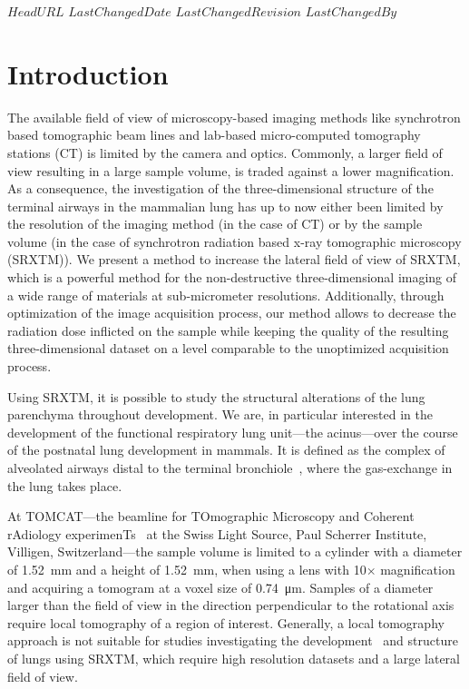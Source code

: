 \svnidlong
{$HeadURL$}
{$LastChangedDate$}
{$LastChangedRevision$}
{$LastChangedBy$}
%
\section{Introduction}
The available field of view of microscopy-based imaging methods like synchrotron based tomographic beam lines and lab-based micro-computed tomography stations (\micro CT) is limited by the camera and optics. Commonly, a larger field of view resulting in a large sample volume, is traded against a lower magnification. As a consequence, the investigation of the three-dimensional structure of the terminal airways in the mammalian lung has up to now either been limited by the resolution of the imaging method (in the case of \micro CT) or by the sample volume (in the case of synchrotron radiation based x-ray tomographic microscopy (SRXTM)). We present a method to increase the lateral field of view of SRXTM, which is a powerful method for the non-destructive three-dimensional imaging of a wide range of materials at sub-micrometer resolutions. Additionally, through optimization of the image acquisition process, our method allows to decrease the radiation dose inflicted on the sample while keeping the quality of the resulting three-dimensional dataset on a level comparable to the unoptimized acquisition process.

Using SRXTM, it is possible to study the structural alterations of the lung parenchyma throughout development. We are, in particular interested in the development of the functional respiratory lung unit---the acinus---over the course of the postnatal lung development in mammals. It is defined as the complex of alveolated airways distal to the terminal bronchiole~\cite{Rodriguez1987}, where the gas-exchange in the lung takes place.

At TOMCAT---the beamline for TOmographic Microscopy and Coherent rAdiology experimenTs~\cite{Stampanoni2007} at the Swiss Light Source, Paul Scherrer Institute, Villigen, Switzerland---the sample volume is limited to a cylinder with a diameter of \SI{1.52}{\milli\meter} and a height of \SI{1.52}{\milli\meter}, when using a lens with 10$\times$ magnification and acquiring a tomogram at a voxel size of \SI{0.74}{\micro\meter}. Samples of a diameter larger than the field of view in the direction perpendicular to the rotational axis require local tomography of a region of interest. Generally, a local tomography approach is not suitable for studies investigating the development~\cite{Schittny2008,Mund2008,Haberthuer2009c} and structure~\cite{Tsuda2008} of lungs using SRXTM, which require high resolution datasets and a large lateral field of view.

